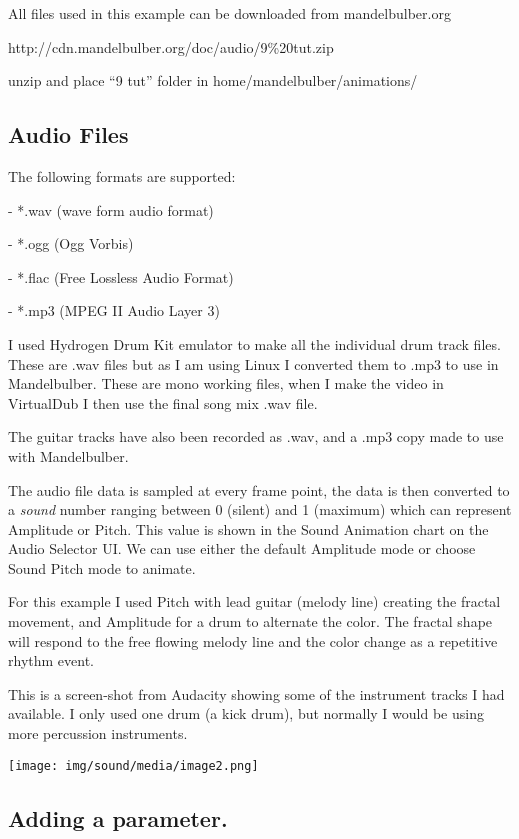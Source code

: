 All files used in this example can be downloaded from mandelbulber.org

http://cdn.mandelbulber.org/doc/audio/9\%20tut.zip

unzip and place ``9 tut'' folder in home/mandelbulber/animations/

\subsection{Audio Files}\label{audio-files}

The following formats are supported:

- *.wav (wave form audio format)

- *.ogg (Ogg Vorbis)

- *.flac (Free Lossless Audio Format)

- *.mp3 (MPEG II Audio Layer 3)

I used Hydrogen Drum Kit emulator to make all the individual drum track
files. These are .wav files but as I am using Linux I converted them to
.mp3 to use in Mandelbulber. These are mono working files, when I make
the video in VirtualDub I then use the final song mix .wav file.

The guitar tracks have also been recorded as .wav, and a .mp3 copy made
to use with Mandelbulber.

The audio file data is sampled at every frame point, the data is then
converted to a \emph{sound} number ranging between 0 (silent) and 1
(maximum) which can represent Amplitude or Pitch. This value is shown in
the Sound Animation chart on the Audio Selector UI. We can use either
the default Amplitude mode or choose Sound Pitch mode to animate.

For this example I used Pitch with lead guitar (melody line) creating
the fractal movement, and Amplitude for a drum to alternate the color.
The fractal shape will respond to the free flowing melody line and the
color change as a repetitive rhythm event.

This is a screen-shot from Audacity showing some of the instrument
tracks I had available. I only used one drum (a kick drum), but normally
I would be using more percussion instruments.

\texttt{[image: img/sound/media/image2.png]}

\subsection{Adding a parameter.}\label{adding-a-parameter.}

